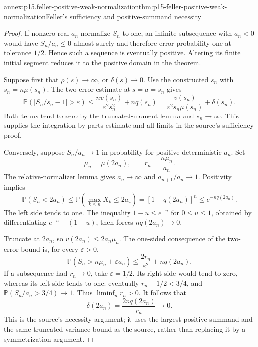 \begin{annexitem}{annex:p15.feller-positive-weak-normalization}{thm:p15-feller-positive-weak-normalization}{Feller's sufficiency and positive-summand necessity}
\begin{proof}
If nonzero real \(a_n\) normalize \(S_n\) to one, an infinite
subsequence with \(a_n<0\) would have \(S_n/a_n\leq0\) almost
surely and therefore error probability one at tolerance \(1/2\).
Hence such a sequence is eventually positive. Altering its finite
initial segment reduces it to the positive domain in the theorem.

Suppose first that \(\rho(s)\to\infty\), or \(\delta(s)\to0\).
Use the constructed \(s_n\) with \(s_n=n\mu(s_n)\).
The two-error estimate at \(s=a=s_n\) gives
\[
 \mathbb P(|S_n/s_n-1|>\varepsilon)
 \leq \frac{n v(s_n)}{\varepsilon^2s_n^2}+nq(s_n)
 =\frac{v(s_n)}{\varepsilon^2s_n\mu(s_n)}+\delta(s_n).
\]
Both terms tend to zero by the truncated-moment lemma and
\(s_n\to\infty\). This supplies the integration-by-parts estimate
and all limits in the source's sufficiency proof.

Conversely, suppose \(S_n/a_n\to1\) in probability for positive
deterministic \(a_n\). Set
\[
 \mu_n=\mu(2a_n),\qquad r_n=\frac{n\mu_n}{a_n}.
\]
The relative-normalizer lemma gives \(a_n\to\infty\) and
\(a_{n+1}/a_n\to1\). Positivity implies
\[
 \mathbb P(S_n<2a_n)
 \leq\mathbb P\!\left(\max_{k\leq n}X_k\leq2a_n\right)
 =[1-q(2a_n)]^n
 \leq e^{-nq(2a_n)}.
\]
The left side tends to one. The inequality
\(1-u\leq e^{-u}\) for \(0\leq u\leq1\), obtained by
differentiating \(e^{-u}-(1-u)\), then forces
\(nq(2a_n)\to0\).

Truncate at \(2a_n\), so \(v(2a_n)\leq2a_n\mu_n\).
The one-sided consequence of the two-error bound is, for every
\(\varepsilon>0\),
\[
 \mathbb P(S_n>n\mu_n+\varepsilon a_n)
       \leq \frac{2r_n}{\varepsilon^2}+nq(2a_n).
\]
If a subsequence had \(r_n\to0\), take \(\varepsilon=1/2\).
Its right side would tend to zero, whereas its left side tends
to one: eventually \(r_n+1/2<3/4\), and
\(\mathbb P(S_n/a_n>3/4)\to1\).
Thus \(\liminf_n r_n>0\). It follows that
\[
 \delta(2a_n)=\frac{2nq(2a_n)}{r_n}\longrightarrow0.
\]
This is the source's necessity argument; it uses the largest
positive summand and the same truncated variance bound as the
source, rather than replacing it by a symmetrization argument.


\end{proof}
\end{annexitem}
